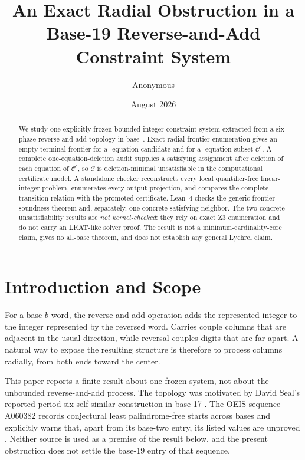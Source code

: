 \documentclass[11pt]{article}
\title{An Exact Radial Obstruction in a Base-19 Reverse-and-Add Constraint System}
\author{Anonymous}
\date{August 2026}
\newcommand{\Ccore}{\ensuremath{\mathcal{C}^{\prime}}}
\begin{document}
\maketitle

\begin{abstract}
We study one explicitly frozen bounded-integer constraint system extracted
from a six-phase reverse-and-add topology in base~\BaseValue.  Exact radial
frontier enumeration gives an empty terminal frontier for a
\CandidateEquationCount-equation candidate and for a
\CoreEquationCount-equation subset \Ccore.  A complete one-equation-deletion
audit supplies a satisfying assignment after deletion of each equation of
\Ccore, so \Ccore is deletion-minimal unsatisfiable in the computational
certificate model.  A standalone checker reconstructs every local
quantifier-free linear-integer problem, enumerates every output projection,
and compares the complete transition relation with the promoted certificate.
Lean~4 checks the generic frontier soundness theorem and, separately, one
concrete satisfying neighbor.  The two concrete unsatisfiability results are
\emph{not kernel-checked}: they rely on exact Z3 enumeration and do not carry
an LRAT-like solver proof.  The result is not a minimum-cardinality-core
claim, gives no all-base theorem, and does not establish any general Lychrel
claim.
\end{abstract}

\section{Introduction and Scope}

For a base-$b$ word, the reverse-and-add operation adds the represented
integer to the integer represented by the reversed word.  Carries couple
columns that are adjacent in the usual direction, while reversal couples
digits that are far apart.  A natural way to expose the resulting structure
is therefore to process columns radially, from both ends toward the center.

This paper reports a finite result about one frozen system, not about the
unbounded reverse-and-add process.  The topology was motivated by David
Seal's reported period-six self-similar construction in base 17
\cite{brownSeal}.  The OEIS sequence A060382 records conjectural least
palindrome-free starts across bases and explicitly warns that, apart from its
base-two entry, its listed values are unproved \cite{oeisA060382}.  Neither
source is used as a premise of the result below, and the present obstruction
does not settle the base-19 entry of that sequence.
\end{document}
